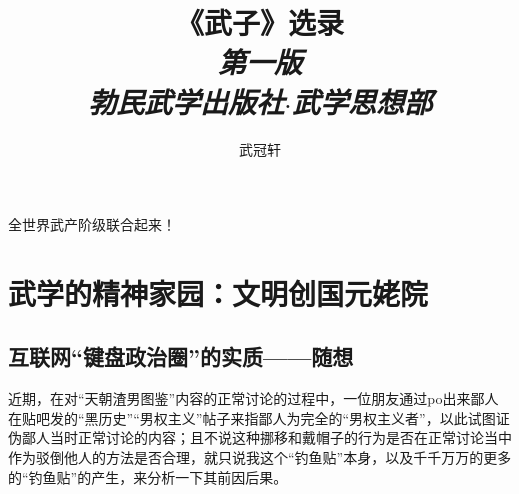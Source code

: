 \documentclass{ctexart}
\title{{\LARGE《武子》选录}\\\textit{第一版\\勃民武学出版社$\cdot$武学思想部}}
\author{武冠轩}
\date{}
\begin{document}
	\maketitle
	\vspace{10em}
	\begin{center}
		{\Large 全世界武产阶级联合起来！}
	\end{center}
	
	\pagebreak
	\tableofcontents
	\pagebreak
	\section{武学的精神家园：文明创国元姥院}
	\subsection{互联网“键盘政治圈”的实质——随想}
	近期，在对“天朝渣男图鉴”内容的正常讨论的过程中，一位朋友通过po出来鄙人在贴吧发的“黑历史”“男权主义”帖子来指鄙人为完全的“男权主义者”，以此试图证伪鄙人当时正常讨论的内容；且不说这种挪移和戴帽子的行为是否在正常讨论当中作为驳倒他人的方法是否合理，就只说我这个“钓鱼贴”本身，以及千千万万的更多的“钓鱼贴”的产生，来分析一下其前因后果。
	
\end{document}
